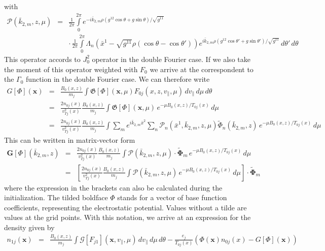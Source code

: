 with
\begin{eqnarray*}
  \mathcal{P}(\bar{k}_{2,m},z,\mu) &=& 
  \frac{1}{2\pi}\int\limits_0^{2\pi} e^{-i\bar k_{2,m}\rho(g^{12}\cos\theta+g\sin\theta)/\sqrt{g^{11}}} \\
  &&\cdot\,\frac{1}{2\pi}\int\limits_0^{2\pi}
  \Lambda_n(\bar{x}^1-\sqrt{g^{11}}\rho(\cos\theta-\cos\theta'))
  e^{i\bar{k}_{2,m} \rho\left(
      g^{12}\cos\theta'+g\sin\theta'
    \right)/\sqrt{g^{11}}
  }\,d\theta' \,d\theta 
\end{eqnarray*}
This operator accords to $J_0^2$ operator in the double Fourier case.
If we also take the moment of this operator weighted with $F_0$ we
arrive at the correspondent to the $\Gamma_0$ function in the double
Fourier case. We can therefore write
\begin{eqnarray*}
  G[\Phi](\mathbf{x}) &=& \frac{B_0(x,z)}{m_j}\int
  \mathfrak{G}[\Phi](\mathbf{x},\mu) F_{0j}(x,z,v_\|,\mu)\,dv_\|\,d\mu\,d\theta\\
  &=& \frac{2n_{0j}(x)}{v_{Tj}^2(x)}\frac{B_0(x,z)}{m_j}\int\mathfrak{G}[\Phi](\mathbf{x},\mu)
  \,e^{-\mu B_0(x,z)/T_{0j}(x)}\,d\mu\\
  &=& \frac{2n_{0j}(x)}{v_{Tj}^2(x)}\frac{B_0(x,z)}{m_j}
  \int \sum_m e^{i\bar k_{2,m}\bar x^2} \sum_n \mathcal{P}_n(\bar{x}^1,\bar{k}_{2,m},z,\mu) \tilde{\Phi}_{n}(\bar{k}_{2,m},z)
  \,e^{-\mu B_0(x,z)/T_{0j}(x)}\,d\mu
\end{eqnarray*}
This can be written in matrix-vector form
\begin{eqnarray*}
  \mathbf{G}[\Phi](\bar{k}_{2,m},z) &=& 
  \frac{2n_{0j}(x)}{v_{Tj}^2(x)}\frac{B_0(x,z)}{m_j}\int \mathcal{P}(\bar k_{2,m},z,\mu)\cdot\tilde{\mathbf{\Phi}}_m
  \,e^{-\mu B_0(x,z)/T_{0j}(x)}\,d\mu\\
  &=& \left[\frac{2n_{0j}(x)}{v_{Tj}^2(x)}\frac{B_0(x,z)}{m_j}\int \mathcal{P}(\bar{k}_{2,m},z,\mu)
    \,e^{-\mu B_0(x,z)/T_{0j}(x)}\,d\mu\right] \cdot\tilde{\mathbf{\Phi}}_m
\end{eqnarray*}
where the expression in the brackets can also be calculated during the
initialization. The tilded boldface $\Phi$ stands for a vector of
base function coefficients, representing the electrostatic potential. Values
without a tilde are values at the grid points.
With this notation, we arrive at an expression for the density given
by
\begin{eqnarray*}
  n_{1j}(\mathbf{x}) &=&
  \frac{B_0(x,z)}{m_j}\int \mathcal{G}[F_{j1}](\mathbf{x},v_\|,\mu)\,dv_\|\,d\mu\,d\theta
  -\frac{e_j}{T_{0j}(x)}\left(
    \Phi(\mathbf{x}) n_{0j}(x)
    -G[\Phi](\mathbf{x})
  \right) 
\end{eqnarray*}

